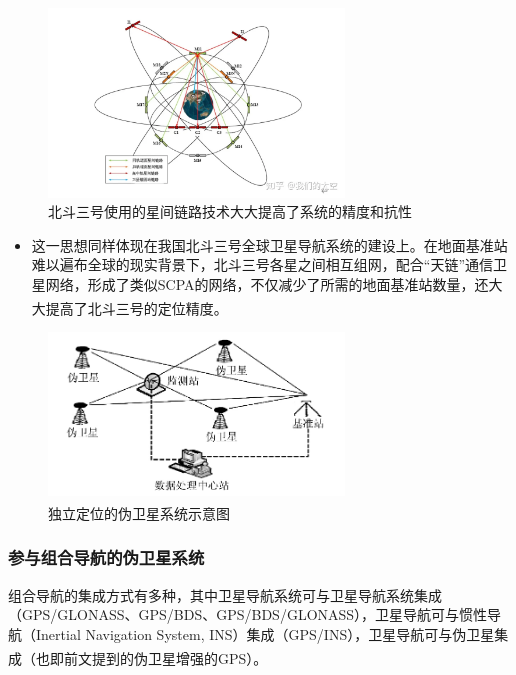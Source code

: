 \documentclass[12pt, a4paper, oneside]{ctexart}
\newcommand{\upcite}[1]{\textsuperscript{\cite{#1}}}
\begin{document}
\begin{figure}[ht]
  \centering
  \includegraphics[width=0.70\textwidth]{img/xjll.png}
  \caption{北斗三号使用的星间链路技术大大提高了系统的精度和抗性}
  \label{}
\end{figure}

\begin{itemize}
\item 这一思想同样体现在我国北斗三号全球卫星导航系统的建设上。在地面基准站难以遍布全球的现实背景下，北斗三号各星之间相互组网，配合“天链”通信卫星网络，形成了类似SCPA的网络，不仅减少了所需的地面基准站数量，还大大提高了北斗三号的定位精度。\upcite{13}
\end{itemize}

\begin{figure}[ht]
  \centering
  \includegraphics[width=0.70\textwidth]{img/2.png}
  \caption{独立定位的伪卫星系统示意图\upcite{002}}
  \label{}
\end{figure}

\subsubsection{参与组合导航的伪卫星系统}

组合导航的集成方式有多种，其中卫星导航系统可与卫星导航系统集成（GPS/GLONASS、GPS/BDS、GPS/BDS/GLONASS），卫星导航可与惯性导航（Inertial Navigation System, INS）集成（GPS/INS），卫星导航可与伪卫星集成（也即前文提到的伪卫星增强的GPS）。\upcite{002}
\end{document}
